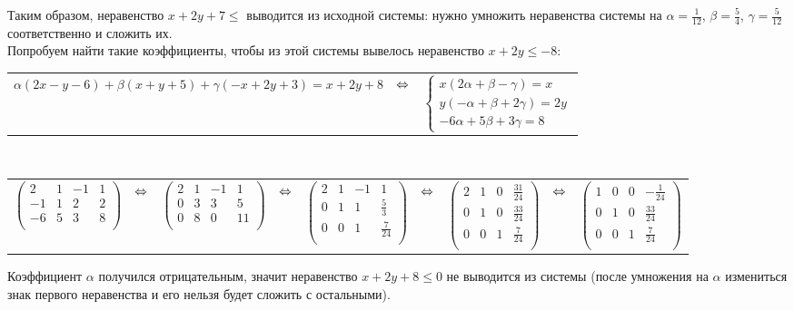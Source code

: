 \documentclass{article}
\begin{document}
	Таким образом, неравенство $x+2y+7\leq$ выводится из исходной системы: нужно умножить неравенства системы на $\alpha = \frac{1}{12}$, $\beta = \frac{5}{4}$, $\gamma = \frac{5}{12}$ соответственно и сложить их. \\
	Попробуем найти такие коэффициенты, чтобы из этой системы вывелось неравенство $x+2y\leq-8$:\\
	\begin{center}
		\begin{tabular}{ccc}
			$\alpha(2x-y-6) + \beta(x+y+5) + \gamma(-x+2y+3) = x+2y+8$
			& $\hfill \Leftrightarrow \hfill$ &
			$\begin{cases}
			x(2\alpha + \beta -\gamma) = x \\
			y(-\alpha + \beta + 2\gamma) = 2y \\
			-6\alpha + 5\beta + 3\gamma = 8
			\end{cases} $ 
		\end{tabular}
		\\
		\fontsize{8}{8}
		\begin{tabular}{ccccccccc}
			$\left(\begin{array}{ccc|c}
			2 	& 1 	& -1 	& 1	\\
			-1	& 1		& 2 	& 2	\\
			-6	& 5		& 3 	& 8	\\
			\end{array}\right)$
			& $\hfill \Leftrightarrow \hfill$ &
			$\left(\begin{array}{ccc|c}
			2 	& 1 	& -1 	& 1	\\
			0	& 3		& 3 	& 5	\\
			0	& 8		& 0 	& 11\\
			\end{array}\right)$
			& $\hfill \Leftrightarrow \hfill$ & 
			$\left(\begin{array}{ccc|c}
			2 	& 1 	& -1 	& 1	\\
			0	& 1		& 1		& \frac{5}{3}	\\
			0	& 0		& 1 	& \frac{7}{24}\\
			\end{array}\right)$
			& $\hfill \Leftrightarrow \hfill$ & 
			$\left(\begin{array}{ccc|c}
			2 	& 1 	& 0 	& \frac{31}{24}	\\
			0	& 1		& 0		& \frac{33}{24}	\\
			0	& 0		& 1 	& \frac{7}{24}\\
			\end{array}\right)$
			& $\hfill \Leftrightarrow \hfill$ & 
			$\left(\begin{array}{ccc|c}
			1 	& 0 	& 0 	& -\frac{1}{24}	\\
			0	& 1		& 0		& \frac{33}{24}	\\
			0	& 0		& 1 	& \frac{7}{24}\\
			\end{array}\right)$
		\end{tabular}
		\fontsize{12}{12}
	\end{center}
	Коэффициент $\alpha$ получился отрицательным, значит неравенство $x+2y+8\leq 0$ не выводится из системы (после умножения на $\alpha$ измениться знак первого неравенства и его нельзя будет сложить с остальными). 
\end{document}
